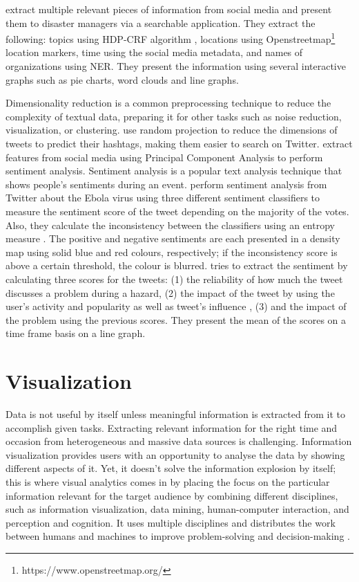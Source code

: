  extract multiple relevant pieces of information from
social media and present them to disaster managers via a searchable application. They extract the
following: topics using HDP-CRF algorithm \cite{tehHierarchicalBayesianNonparametric2010}, locations
using Openstreetmap\footnote{https://www.openstreetmap.org/} location markers, time using the social
media metadata, and names of organizations using \ac{NER}. They present the information using
several interactive graphs such as pie charts, word clouds and line graphs.

Dimensionality reduction is a common preprocessing technique to reduce the complexity of textual
data, preparing it for other tasks such as noise reduction, visualization, or clustering.
 use random projection to reduce the
dimensions of tweets to predict their hashtags, making them easier to search on Twitter.
 extract features from social media using Principal
Component Analysis to perform sentiment analysis. Sentiment analysis is a popular text analysis
technique that shows people's sentiments during an event. 
perform sentiment analysis from Twitter about the Ebola virus using three different sentiment
classifiers to measure the sentiment score of the tweet depending on the majority of the votes.
Also, they calculate the inconsistency between the classifiers using an entropy measure
\cite{argamon-engelsonCommitteeBasedSampleSelection1999}. The positive and negative sentiments are
each presented in a density map using solid blue and red colours, respectively; if the inconsistency
score is above a certain threshold, the colour is blurred.
 tries to extract the sentiment by calculating
three scores for the tweets: (1) the reliability of how much the tweet discusses a problem during a
hazard, (2) the impact of the tweet by using the user's activity and popularity as well as tweet's
influence \cite{palIdentifyingTopicalAuthorities2011}, (3) and the impact of the
problem using the previous scores. They present the mean of the scores on a time frame basis on a
line graph.

\section{Visualization}
Data is not useful by itself unless meaningful information is extracted from it to accomplish
given tasks. Extracting relevant information for the right time and occasion from heterogeneous
and massive data sources is challenging. Information visualization provides users with an
opportunity to analyse the data by showing different aspects of it. Yet, it doesn't solve the
information explosion by itself; this is where visual analytics comes in by placing the focus on
the particular information relevant for the target audience by combining different disciplines, such as
information visualization, data mining, human-computer interaction, and perception and
cognition. It uses multiple disciplines and distributes the work between humans and machines to
improve problem-solving and decision-making \cite{keimVisualAnalyticsDefinition2008}.


